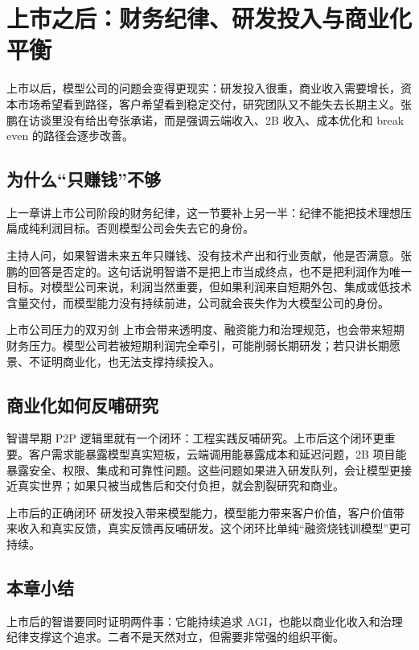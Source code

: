 \section{上市之后：财务纪律、研发投入与商业化平衡}

上市以后，模型公司的问题会变得更现实：研发投入很重，商业收入需要增长，资本市场希望看到路径，客户希望看到稳定交付，研究团队又不能失去长期主义。张鹏在访谈里没有给出夸张承诺，而是强调云端收入、2B 收入、成本优化和 break even 的路径会逐步改善。

\subsection{为什么“只赚钱”不够}

上一章讲上市公司阶段的财务纪律，这一节要补上另一半：纪律不能把技术理想压扁成纯利润目标。否则模型公司会失去它的身份。

主持人问，如果智谱未来五年只赚钱、没有技术产出和行业贡献，他是否满意。张鹏的回答是否定的。这句话说明智谱不是把上市当成终点，也不是把利润作为唯一目标。对模型公司来说，利润当然重要，但如果利润来自短期外包、集成或低技术含量交付，而模型能力没有持续前进，公司就会丧失作为大模型公司的身份。

\begin{warningbox}{上市公司压力的双刃剑}
上市会带来透明度、融资能力和治理规范，也会带来短期财务压力。模型公司若被短期利润完全牵引，可能削弱长期研发；若只讲长期愿景、不证明商业化，也无法支撑持续投入。
\end{warningbox}

\subsection{商业化如何反哺研究}

智谱早期 P2P 逻辑里就有一个闭环：工程实践反哺研究。上市后这个闭环更重要。客户需求能暴露模型真实短板，云端调用能暴露成本和延迟问题，2B 项目能暴露安全、权限、集成和可靠性问题。这些问题如果进入研发队列，会让模型更接近真实世界；如果只被当成售后和交付负担，就会割裂研究和商业。

\begin{importantbox}{上市后的正确闭环}
研发投入带来模型能力，模型能力带来客户价值，客户价值带来收入和真实反馈，真实反馈再反哺研发。这个闭环比单纯“融资烧钱训模型”更可持续。
\end{importantbox}

\subsection{本章小结}

上市后的智谱要同时证明两件事：它能持续追求 AGI，也能以商业化收入和治理纪律支撑这个追求。二者不是天然对立，但需要非常强的组织平衡。

